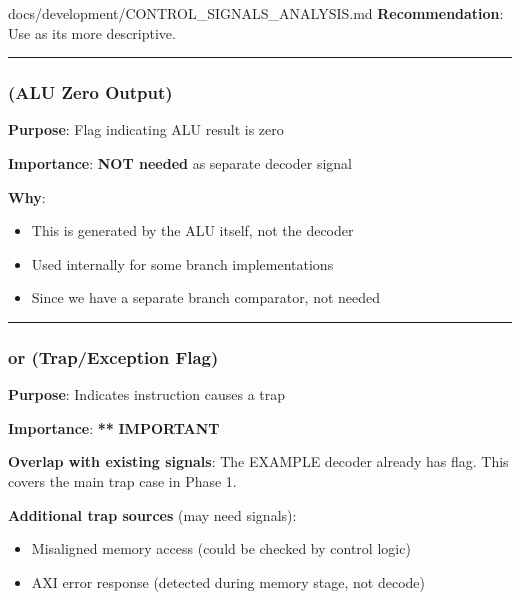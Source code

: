 \begin{relocated}{docs/development/CONTROL_SIGNALS_ANALYSIS.md}
\textbf{Recommendation}: Use  as it\textquotesingle s
more descriptive.

\begin{center}\rule{0.5\linewidth}{0.5pt}\end{center}

\subsubsection{\texorpdfstring{ (ALU Zero
Output)}{(ALU Zero Output)}}\label{tm:flow:control-signals-analysis:5-alu-zero-alu-zero-output}

\textbf{Purpose}: Flag indicating ALU result is zero

\textbf{Importance}: \bad{} \textbf{NOT needed} as separate decoder
signal

\textbf{Why}:

\begin{itemize}
\tightlist
\item
  This is generated by the ALU itself, not the decoder
\item
  Used internally for some branch implementations
\item
  Since we have a separate branch comparator, not needed
\end{itemize}

\begin{center}\rule{0.5\linewidth}{0.5pt}\end{center}

\subsubsection{\texorpdfstring{ or 
(Trap/\allowbreak{}Exception Flag)}{or  (Trap/Exception Flag)}}\label{tm:flow:control-signals-analysis:6-trap-or-exception-trapexception-flag}

\textbf{Purpose}: Indicates instruction causes a trap

\textbf{Importance}: \textbf{*}\textbf{*} \textbf{IMPORTANT}

\textbf{Overlap with existing signals}: The EXAMPLE decoder already has
 flag. This covers the main trap case in Phase 1.

\textbf{Additional trap sources} (may need signals):

\begin{itemize}
\tightlist
\item
  Misaligned memory access (could be checked by control logic)
\item
  AXI error response (detected during memory stage, not decode)
\end{itemize}


\end{relocated}
